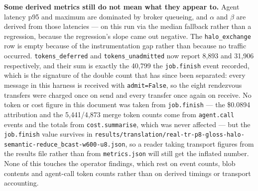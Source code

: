 \documentclass[11pt]{article}
\begin{document}
\textbf{Some derived metrics still do not mean what they appear to.} Agent latency p95 and
maximum are dominated by broker queueing, and $\alpha$ and $\beta$ are derived from those
latencies --- on this run via the median fallback rather than a regression, because the
regression's slope came out negative. The \texttt{halo\_exchange} row is empty because of the
instrumentation gap rather than because no traffic occurred. \texttt{tokens\_deferred} and
\texttt{tokens\_unadmitted} now report 8{,}893 and 31{,}906 respectively, and their sum is
exactly the 40{,}799 the \texttt{job.finish} event recorded, which is the signature of the
double count that has since been separated: every message in this harness is received with
\texttt{admit=False}, so the eight rendezvous transfers were charged once on send and every
transfer once again on receive. No token or cost figure in this document was taken from
\texttt{job.finish} --- the \$0.0894 attribution and the 5{,}441/4{,}873 merge token counts come
from \texttt{agent.call} events and the totals from \texttt{cost.summarise}, which was never
affected --- but the \texttt{job.finish} value survives in
\texttt{results/translation/real-tr-p8-gloss-halo-semantic-reduce\_bcast-w600-u8.json}, so a
reader taking transport figures from the results file rather than from
\texttt{metrics.json} will still get the inflated number. None of this touches the operator
findings, which rest on event counts, blob contents and agent-call token counts rather than on
derived timings or transport accounting.
\end{document}
